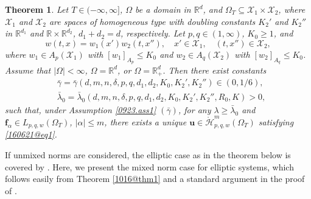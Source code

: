 \documentclass[reqno]{amsart}
\numberwithin{equation}{section}
\theoremstyle{plain}
\newtheorem{theorem}{Theorem}[section]
\theoremstyle{definition}
\theoremstyle{remark}
\begin{document}
\begin{theorem}		\label{160621@thm2}
Let $T\in (-\infty,\infty]$, $\Omega$  be a domain in ${\mathbb{R}}^d$, and $\Omega_T\subseteq {\mathcal{X}}_1\times {\mathcal{X}}_2$, where ${\mathcal{X}}_1$ and ${\mathcal{X}}_2$ are  spaces of homogeneous type with  doubling constants $K_2'$ and $K_2''$ in ${\mathbb{R}}^{d_1}$ and ${\mathbb{R}}\times {\mathbb{R}}^{d_2}$, $d_1+d_2=d$, respectively.
Let $p,q\in (1,\infty)$, $K_0\ge 1$, and 
$$
w(t,x)=w_1(x')w_2(t,x''), \quad x'\in {\mathcal{X}}_1, \quad (t,x'')\in {\mathcal{X}}_2,
$$
where $w_1\in A_p({\mathcal{X}}_1)$ with $[w_1]_{A_p}\le K_0$ and $w_2\in A_q({\mathcal{X}}_2)$ with $[w_2]_{A_q}\le K_0$.
Assume that $|\Omega|<\infty$, $\Omega={\mathbb{R}}^d$, or $\Omega={\mathbb{R}}^d_+$.
Then there exist constants 
\begin{align*}
&\bar{\gamma}=\bar{\gamma}(d,m,n,\delta,p,q,d_1,d_2,K_0, K_2', K_2'')\in (0,1/6),\\
&\bar{\lambda}_0=\bar{\lambda}_0(d,m,n,\delta,p,q,d_1,d_2, K_0, K_2',K_2'',R_0,K)>0,
\end{align*}
such that, under Assumption \ref{0923.ass1} $(\bar{\gamma})$, for any $\lambda\ge \bar{\lambda}_0$ and ${\boldsymbol{f}}_\alpha\in L_{p,q,w}(\Omega_T)$, $|\alpha|\le m$, there exists a unique
${\boldsymbol{u}}\in \mathring{\mathcal{H}}^m_{p,q,w}(\Omega_T)$ satisfying \eqref{160621@eq1}.
\end{theorem}

If unmixed norms are considered, the elliptic case as in the theorem below is covered by  \cite{MR2835999}.
Here, we present  the mixed norm case for elliptic systems, which follows easily from Theorem \ref{1016@thm1} and a standard argument  in the proof of  \cite[Theorem 2.6]{MR2650802}.
\end{document}
